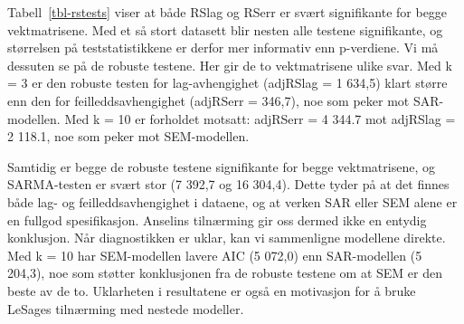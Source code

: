 \documentclass[
  norsk,
  a4paper,
]{article}
\begin{document}
\begin{table}

\caption{\label{tbl-rstests}Rao's score-tester (LM) for
OLS-residualene.}


\end{table}%

Tabell~\ref{tbl-rstests} viser at både RSlag og RSerr er svært
signifikante for begge vektmatrisene. Med et så stort datasett blir
nesten alle testene signifikante, og størrelsen på teststatistikkene er
derfor mer informativ enn p-verdiene. Vi må dessuten se på de robuste
testene. Her gir de to vektmatrisene ulike svar. Med k = 3 er den
robuste testen for lag-avhengighet (adjRSlag = 1 634,5) klart større enn
den for feilleddsavhengighet (adjRSerr = 346,7), noe som peker mot
SAR-modellen. Med k = 10 er forholdet motsatt: adjRSerr = 4 344.7 mot
adjRSlag = 2 118.1, noe som peker mot SEM-modellen.

Samtidig er begge de robuste testene signifikante for begge
vektmatrisene, og SARMA-testen er svært stor (7 392,7 og 16 304,4).
Dette tyder på at det finnes både lag- og feilleddsavhengighet i
dataene, og at verken SAR eller SEM alene er en fullgod spesifikasjon.
Anselins tilnærming gir oss dermed ikke en entydig konklusjon. Når
diagnostikken er uklar, kan vi sammenligne modellene direkte. Med k = 10
har SEM-modellen lavere AIC (5 072,0) enn SAR-modellen (5 204,3), noe
som støtter konklusjonen fra de robuste testene om at SEM er den beste
av de to. Uklarheten i resultatene er også en motivasjon for å bruke
LeSages tilnærming med nestede modeller.
\end{document}

